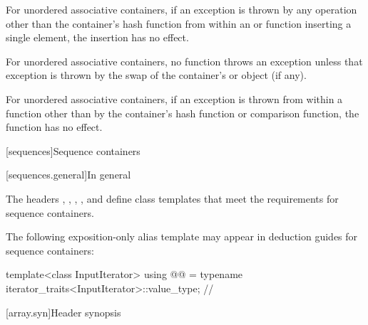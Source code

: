 \pnum
For unordered associative containers, if an exception is thrown by any
operation other than the container's hash function from within an
 or  function inserting a single element,
the insertion has no effect.

\pnum
For unordered associative containers, no  function throws
an exception unless that exception is thrown by the swap of the container's
 or  object (if any).

\pnum
{}%
%
For unordered associative containers, if an exception is thrown
from within a  function other than by the container's hash
function or comparison function, the  function has no effect.

[sequences]{Sequence containers}

[sequences.general]{In general}

\pnum
The headers , , ,
, and  define class templates that meet the
requirements for sequence containers.

\pnum
The following exposition-only alias template may appear in deduction guides for sequence containers:

\begin{codeblock}
template<class InputIterator>
  using @@ = typename iterator_traits<InputIterator>::value_type;  // \expos
\end{codeblock}

[array.syn]{Header  synopsis}

